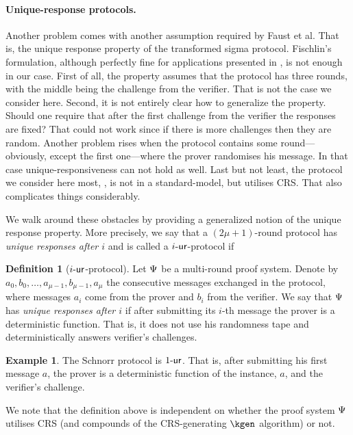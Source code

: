 \documentclass[runningheads,11pt]{llncs}
\theoremstyle{definition}
\newtheorem{definition}[theorem]{Definition}
\newtheorem{example}[theorem]{Example}
\begin{document}
\paragraph{Unique-response protocols.}
Another problem comes with another assumption required by Faust et al. That is, the unique response property of the transformed sigma protocol.
Fischlin's formulation, although perfectly fine for applications presented in \cite{C:Fischlin05}, is not enough in our case.
First of all, the property assumes that the protocol has three rounds, with the middle being the challenge from the verifier. That is not the case we consider here. Second, it is not entirely clear how to generalize the property. Should one require that after the first challenge from the verifier the responses are fixed? That could not work since if there is more challenges then they are random.
Another problem rises when the protocol contains some round---obviously, except the first one---where the prover randomises his message. In that case unique-responsiveness can not hold as well.
Last but not least, the protocol we consider here most, \plonk, is not in a standard-model, but utilises CRS. That also complicates things considerably.

We walk around these obstacles by providing a generalized notion of the unique response property.
More precisely, we say that a $(2\mu + 1)$-round protocol has \emph{unique responses after $i$} and is called a ${i\text{-}\mathsf{ur}}$-protocol if
\begin{definition}[${i\text{-}\mathsf{ur}}$-protocol]
	\label{def:wiur}
	Let $\mathrm{\Psi}$ be a multi-round proof system.
	Denote by $a_0, b_0, \ldots, a_{\mu - 1}, b_{\mu - 1}, a_{\mu}$ the consecutive messages exchanged in the protocol, where messages $a_i$ come from the prover and $b_i$ from the verifier.
	We say that $\mathrm{\Psi}$ has \emph{unique responses after $i$}
	if after submitting its $i$-th message the prover is a deterministic function. That is, it does not use his randomness tape and deterministically answers verifier's challenges.
\end{definition}
\begin{example}
	The Schnorr protocol is ${1\text{-}\mathsf{ur}}$. That is, after submitting his first message $a$, the prover is a deterministic function of the instance, $a$, and the verifier's challenge.
\end{example}

We note that the definition above is independent on whether the proof system $\mathrm{\Psi}$ utilises CRS (and compounds of the CRS-generating $\kgen$ algorithm) or not.
\end{document}
